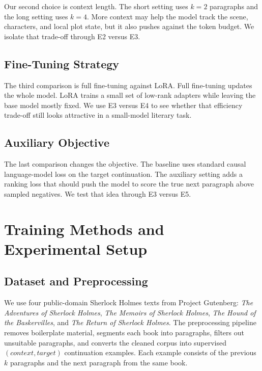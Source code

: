 \documentclass{article}
\newcommand{\expid}[1]{\textsc{#1}}
\begin{document}
Our second choice is context length. The short setting uses $k=2$ paragraphs and the long setting uses $k=4$. More context may help the model track the scene, characters, and local plot state, but it also pushes against the token budget. We isolate that trade-off through \expid{E2} versus \expid{E3}.

\subsection{Fine-Tuning Strategy}

The third comparison is full fine-tuning against LoRA. Full fine-tuning updates the whole model. LoRA trains a small set of low-rank adapters while leaving the base model mostly fixed. We use \expid{E3} versus \expid{E4} to see whether that efficiency trade-off still looks attractive in a small-model literary task.

\subsection{Auxiliary Objective}

The last comparison changes the objective. The baseline uses standard causal language-model loss on the target continuation. The auxiliary setting adds a ranking loss that should push the model to score the true next paragraph above sampled negatives. We test that idea through \expid{E3} versus \expid{E5}.

\section{Training Methods and Experimental Setup}

\subsection{Dataset and Preprocessing}

We use four public-domain Sherlock Holmes texts from Project Gutenberg: \textit{The Adventures of Sherlock Holmes}, \textit{The Memoirs of Sherlock Holmes}, \textit{The Hound of the Baskervilles}, and \textit{The Return of Sherlock Holmes}. The preprocessing pipeline removes boilerplate material, segments each book into paragraphs, filters out unsuitable paragraphs, and converts the cleaned corpus into supervised $(context, target)$ continuation examples. Each example consists of the previous $k$ paragraphs and the next paragraph from the same book.
\end{document}
